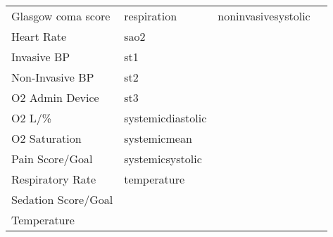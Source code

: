 \documentclass[sigconf]{acmart}
\begin{document}
\begin{table*}[h]
\begin{tabular}{llll}
        Glasgow coma score & respiration & noninvasivesystolic & \\
        Heart Rate & sao2 & & \\
        Invasive BP & st1 & & \\
        Non-Invasive BP & st2 & & \\
        O2 Admin Device & st3 & & \\
        O2 L/\% & systemicdiastolic & & \\
        O2 Saturation & systemicmean & & \\
        Pain Score/Goal & systemicsystolic & & \\
        Respiratory Rate & temperature & & \\
        Sedation Score/Goal & & & \\
        Temperature & & & \\
        \bottomrule
    \end{tabular}
\end{table*}
\end{document}
